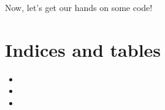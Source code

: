\documentclass[letterpaper,12pt,english]{sphinxmanual}
\begin{document}
\sphinxAtStartPar
Now, let’s get our hands on some code!


\chapter{Indices and tables}
\label{\detokenize{index:indices-and-tables}}\begin{itemize}
\item {} 
\sphinxAtStartPar
{}

\item {} 
\sphinxAtStartPar
{}

\item {} 
\sphinxAtStartPar
{}

\end{itemize}



\renewcommand{\indexname}{Index}
\printindex
\end{document}
